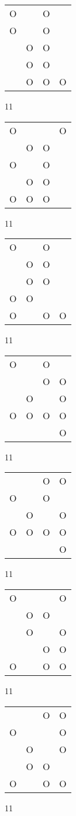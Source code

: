 \begin{tabular}{|m{0.2cm}m{0.2cm}m{0.2cm}m{0.2cm}|}\hline
O& &O& \\
O& &O& \\
 &O&O& \\
 &O&O& \\
 &O&O&O\\
\hline\end{tabular}11
\begin{tabular}{|m{0.2cm}m{0.2cm}m{0.2cm}m{0.2cm}|}\hline
O& & &O\\
 &O&O& \\
O& &O& \\
 &O&O& \\
O&O&O& \\
\hline\end{tabular}11
\begin{tabular}{|m{0.2cm}m{0.2cm}m{0.2cm}m{0.2cm}|}\hline
O& &O& \\
 &O&O& \\
 &O&O& \\
O&O& & \\
O& &O&O\\
\hline\end{tabular}11
\begin{tabular}{|m{0.2cm}m{0.2cm}m{0.2cm}m{0.2cm}|}\hline
O& &O& \\
 & &O&O\\
 &O& &O\\
O&O&O&O\\
 & & &O\\
\hline\end{tabular}11
\begin{tabular}{|m{0.2cm}m{0.2cm}m{0.2cm}m{0.2cm}|}\hline
 & &O&O\\
O& &O& \\
 &O& &O\\
O&O&O&O\\
 & & &O\\
\hline\end{tabular}11
\begin{tabular}{|m{0.2cm}m{0.2cm}m{0.2cm}m{0.2cm}|}\hline
O& & &O\\
 &O&O& \\
 &O& &O\\
 & &O&O\\
O& &O&O\\
\hline\end{tabular}11
\begin{tabular}{|m{0.2cm}m{0.2cm}m{0.2cm}m{0.2cm}|}\hline
 & &O&O\\
O& & &O\\
 &O& &O\\
 &O&O& \\
O& &O&O\\
\hline\end{tabular}11
